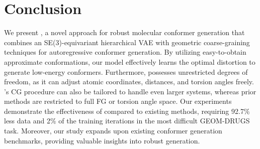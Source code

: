\section{Conclusion}
\vspace{-1ex}
We present \modelns, a novel approach for robust molecular conformer generation that combines an SE(3)-equivariant hierarchical VAE with geometric coarse-graining techniques for autoregressive conformer generation. By utilizing easy-to-obtain approximate conformations, our model effectively learns the optimal distortion to generate low-energy conformers. Furthermore, \model possesses unrestricted degrees of freedom, as it can adjust atomic coordinates, distances, and torsion angles freely. \modelns's CG procedure can also be tailored to handle even larger systems, whereas prior methods are restricted to full FG or torsion angle space.
Our experiments demonstrate the effectiveness of \model compared to existing methods, requiring 92.7\% less data and 2\% of the training iterations in the most difficult GEOM-DRUGS task. Moreover, our study expands upon existing conformer generation benchmarks, providing valuable insights into robust generation.